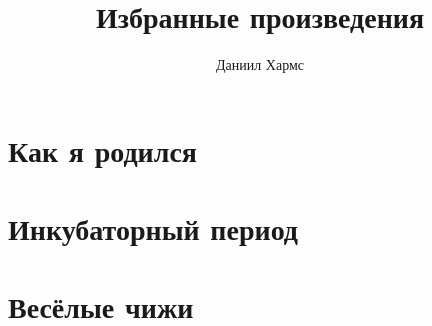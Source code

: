 \documentclass[a4paper]{book}
\title{Избранные произведения}
\author{Даниил Хармс}
\date{}
\begin{document}
\maketitle
\tableofcontents

\chapter{Как я родился}


\chapter{Инкубаторный период}


\chapter{Весёлые чижи}

\end{document}
